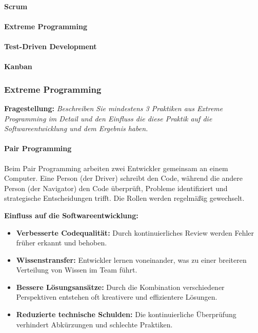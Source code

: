 \paragraph{Scrum}



\paragraph{Extreme Programming}


\paragraph{Test-Driven Development}


\paragraph{Kanban}



\subsubsection{Extreme Programming}

\textbf{Fragestellung:} \textit{Beschreiben Sie mindestens 3 Praktiken aus Extreme Programming im Detail und den Einfluss
die diese Praktik auf die Softwareentwicklung und dem Ergebnis haben.}

\paragraph{Pair Programming}
Beim Pair Programming arbeiten zwei Entwickler gemeinsam an einem Computer. Eine Person (der Driver) schreibt den Code, 
während die andere Person (der Navigator) den Code überprüft, Probleme identifiziert und strategische Entscheidungen trifft. 
Die Rollen werden regelmäßig gewechselt.

\textbf{Einfluss auf die Softwareentwicklung:}
\begin{itemize}
    \item \textbf{Verbesserte Codequalität:} Durch kontinuierliches Review werden Fehler früher erkannt und behoben.
    \item \textbf{Wissenstransfer:} Entwickler lernen voneinander, was zu einer breiteren Verteilung von Wissen im Team führt.
    \item \textbf{Bessere Lösungsansätze:} Durch die Kombination verschiedener Perspektiven entstehen oft kreativere und effizientere Lösungen.
    \item \textbf{Reduzierte technische Schulden:} Die kontinuierliche Überprüfung verhindert Abkürzungen und schlechte Praktiken.
\end{itemize}

